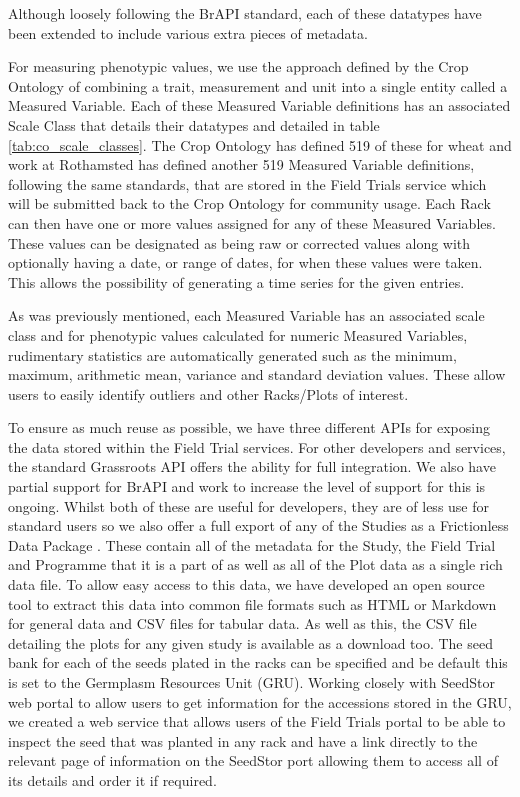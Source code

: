 \documentclass[9pt,a4paper]{extarticle}
\begin{document}
Although loosely following the BrAPI standard, each of these datatypes have been extended to include various extra pieces of metadata. 

For measuring phenotypic values, we use the approach defined by the Crop Ontology of combining a trait, measurement and unit into a single entity called a Measured Variable. 
Each of these Measured Variable definitions has an associated Scale Class that details their datatypes \cite{co_scales} and detailed in table \ref{tab:co_scale_classes}.
The Crop Ontology has defined 519 of these for wheat\cite{co_variables} and work at Rothamsted has defined another 519 Measured Variable definitions, following the same standards, that are stored in the Field Trials service which will be submitted back to the Crop Ontology for community usage.
Each Rack can then have one or more values assigned for any of these Measured Variables. 
These values can be designated as being raw or corrected values along with optionally having a date, or range of dates, for when these values were taken. 
This allows the possibility of generating a time series for the given entries.

As was previously mentioned, each Measured Variable has an associated scale class and for phenotypic values calculated for numeric Measured Variables, rudimentary statistics are automatically generated such as the minimum, maximum, arithmetic mean, variance and standard deviation values. 
These allow users to easily identify outliers and other Racks/Plots of interest.

To ensure as much reuse as possible, we have three different APIs for exposing the data stored within the Field Trial services. 
For other developers and services, the standard Grassroots API offers the ability for full integration. 
We also have partial support for BrAPI and work to increase the level of support for this is ongoing. 
Whilst both of these are useful for developers, they are of less use for standard users so we also offer a full export of any of the Studies as a Frictionless Data Package \cite {frictionless}. 
These contain all of the metadata for the Study, the Field Trial and Programme that it is a part of as well as all of the Plot data as a single rich data file. 
To allow easy access to this data, we have developed an open source tool \cite{grassroots_fd_tool} to extract this data into common file formats such as HTML or Markdown for general data and CSV files for tabular data. 
As well as this, the CSV file detailing the plots for any given study is available as a download too. 
The seed bank for each of the seeds plated in the racks can be specified and be default this is set to the Germplasm Resources Unit (GRU). 
Working closely with SeedStor web portal to allow users to get information for the accessions stored in the GRU, we created a web service that allows users of the Field Trials portal to be able to inspect the seed that was planted in any rack and have a link directly to the relevant page of information on the SeedStor port allowing them to access all of its details and order it if required. 
\end{document}
